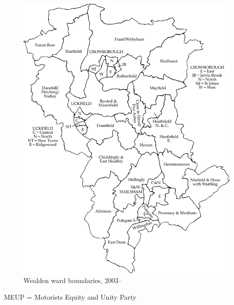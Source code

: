 \begin{figure}
\includegraphics[width=0.99\columnwidth]{source/wealden}
\caption{Wealden ward boundaries, 2003--}
\end{figure}

MEUP = Motorists Equity and Unity Party

